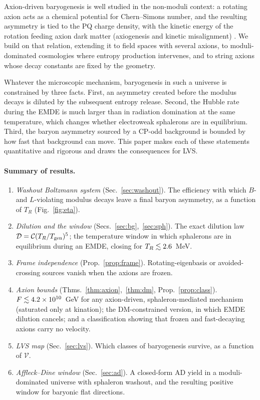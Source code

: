 \documentclass[11pt]{article}
\begin{document}
Axion-driven baryogenesis is well studied in the non-moduli context: a rotating axion acts as a chemical potential for Chern--Simons number, and the resulting asymmetry is tied to the PQ charge density, with the kinetic energy of the rotation feeding axion dark matter (axiogenesis and kinetic misalignment) \cite{Co:2019,Snowmass:2022,Asadi:2025}. We build on that relation, extending it to field spaces with several axions, to moduli-dominated cosmologies where entropy production intervenes, and to string axions whose decay constants are fixed by the geometry.

Whatever the microscopic mechanism, baryogenesis in such a universe is constrained by three facts. First, an asymmetry created before the modulus decays is diluted by the subsequent entropy release. Second, the Hubble rate during the EMDE is much larger than in radiation domination at the same temperature, which changes whether electroweak sphalerons are in equilibrium. Third, the baryon asymmetry sourced by a CP-odd background is bounded by how fast that background can move. This paper makes each of these statements quantitative and rigorous and draws the consequences for LVS.

\paragraph{Summary of results.}
\begin{enumerate}
\item \emph{Washout Boltzmann system} (Sec.~\ref{sec:washout}). The efficiency with which $B$- and $L$-violating modulus decays leave a final baryon asymmetry, as a function of $T_R$ (Fig.~\ref{fig:eta}).
\item \emph{Dilution and the window} (Secs.~\ref{sec:bg},~\ref{sec:sph}). The exact dilution law $\mathcal D=\mathcal C(T_R/T_{\rm gen})^5$; the temperature window in which sphalerons are in equilibrium during an EMDE, closing for $T_R\lesssim2.6$~MeV.
\item \emph{Frame independence} (Prop.~\ref{prop:frame}). Rotating-eigenbasis or avoided-crossing sources vanish when the axions are frozen.
\item \emph{Axion bounds} (Thms.~\ref{thm:axion},~\ref{thm:dm}, Prop.~\ref{prop:class}). $F\lesssim4.2\times10^{10}$~GeV for any axion-driven, sphaleron-mediated mechanism (saturated only at kination); the DM-constrained version, in which EMDE dilution cancels; and a classification showing that frozen and fast-decaying axions carry no velocity.
\item \emph{LVS map} (Sec.~\ref{sec:lvs}). Which classes of baryogenesis survive, as a function of $\mathcal V$.
\item \emph{Affleck--Dine window} (Sec.~\ref{sec:ad}). A closed-form AD yield in a moduli-dominated universe with sphaleron washout, and the resulting positive window for baryonic flat directions.
\end{enumerate}
\end{document}
